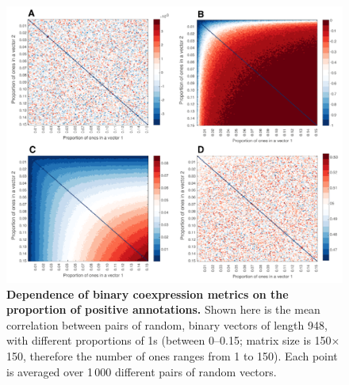 \documentclass[10pt,letterpaper]{article}
\begin{document}
{%

\begin{figure}[h]
\centering
    \includegraphics[width=1\textwidth]{CoexpressionMeasures.pdf}
\caption{
\label{fig:S_propOnes}
\textbf{Dependence of binary coexpression metrics on the proportion of positive annotations.}
Shown here is the mean correlation between pairs of random, binary vectors of length 948, with different proportions of 1s (between 0--0.15; matrix size is 150$\times$150, therefore the number of ones ranges from 1 to 150).
Each point is averaged over 1\,000 different pairs of random vectors.
}
\end{figure}}
\end{document}

